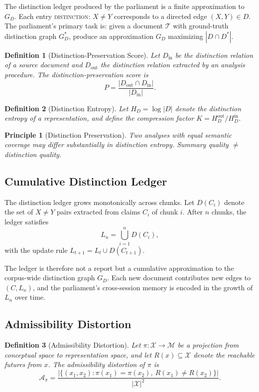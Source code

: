 \documentclass[12pt, a4paper]{article}
\newtheorem{definition}{Definition}[section]
\theoremstyle{principle}
\newtheorem{principle}{Principle}[section]
\theoremstyle{definition}
\begin{document}
The distinction ledger produced by the parliament is a finite approximation to
$G_D$. Each entry \textsc{distinction}: $X \neq Y$ corresponds to a directed edge
$(X, Y) \in D$. The parliament's primary task is: given a document $\mathcal{T}$
with ground-truth distinction graph $G_D^*$, produce an approximation $G_D$
maximizing $|D \cap D^*|$.

\begin{definition}[Distinction-Preservation Score]
Let $D_\mathrm{in}$ be the distinction relation of a source document and
$D_\mathrm{out}$ the distinction relation extracted by an analysis procedure. The
\emph{distinction-preservation score} is
\[
P = \frac{|D_\mathrm{out} \cap D_\mathrm{in}|}{|D_\mathrm{in}|}.
\]
\end{definition}

\begin{definition}[Distinction Entropy]
Let $H_D = \log |D|$ denote the \emph{distinction entropy} of a representation, and
define the \emph{compression factor} $K = H_D^\mathrm{out} / H_D^\mathrm{in}$.
\end{definition}

\begin{principle}[Distinction Preservation]
Two analyses with equal semantic coverage may differ substantially in distinction
entropy. Summary quality $\neq$ distinction quality.
\end{principle}

\subsection{Cumulative Distinction Ledger}

The distinction ledger grows monotonically across chunks. Let $D(C_i)$ denote the
set of $X \neq Y$ pairs extracted from claims $C_i$ of chunk $i$. After $n$ chunks,
the ledger satisfies
\[
L_n = \bigcup_{i=1}^{n} D(C_i),
\]
with the update rule $L_{t+1} = L_t \cup D(C_{t+1})$.

The ledger is therefore not a report but a cumulative approximation to the
corpus-wide distinction graph $G_D$. Each new document contributes new edges to
$(C, L_n)$, and the parliament's cross-session memory is encoded in the growth
of $L_n$ over time.

\subsection{Admissibility Distortion}

\begin{definition}[Admissibility Distortion]
Let $\pi : \mathcal{X} \to \mathcal{M}$ be a projection from conceptual space to
representation space, and let $R(x) \subseteq \mathcal{X}$ denote the reachable
futures from $x$. The \emph{admissibility distortion} of $\pi$ is
\[
\mathcal{A}_\pi =
\frac{\bigl|\{(x_1, x_2) : \pi(x_1) = \pi(x_2),\ R(x_1) \neq R(x_2)\}\bigr|}
{|\mathcal{X}|^2}.
\]
\end{definition}
\end{document}
